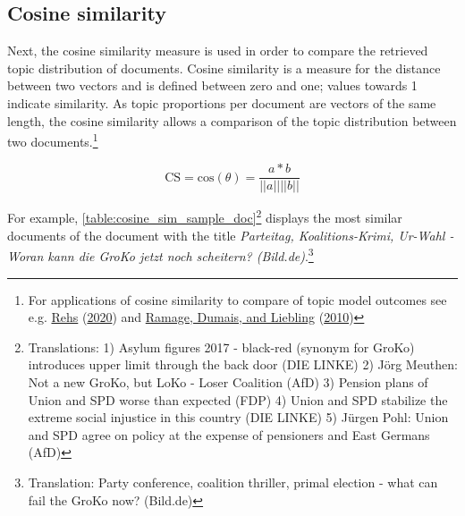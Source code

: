 \documentclass[
]{article}
\begin{document}
\hypertarget{cosine-similarity}{%
\subsection{Cosine similarity}\label{cosine-similarity}}

Next, the cosine similarity measure is used in order to compare the
retrieved topic distribution of documents. Cosine similarity is a
measure for the distance between two vectors and is defined between zero
and one; values towards 1 indicate similarity. As topic proportions per
document are vectors of the same length, the cosine similarity allows a
comparison of the topic distribution between two documents.\footnote{For
  applications of cosine similarity to compare of topic model outcomes
  see e.g. \protect\hyperlink{ref-rehs_structural_2020}{Rehs}
  (\protect\hyperlink{ref-rehs_structural_2020}{2020}) and
  \protect\hyperlink{ref-ramage_characterizing_2010}{Ramage, Dumais, and
  Liebling} (\protect\hyperlink{ref-ramage_characterizing_2010}{2010})}

\[
\text{CS} = \text{cos}(\theta)=\frac{a*b}{||a|| ||b||}
\]

For example, \autoref{table:cosine_sim_sample_doc}\footnote{Translations:
  1) Asylum figures 2017 - black-red (synonym for GroKo) introduces
  upper limit through the back door (DIE LINKE) 2) Jörg Meuthen: Not a
  new GroKo, but LoKo - Loser Coalition (AfD) 3) Pension plans of Union
  and SPD worse than expected (FDP) 4) Union and SPD stabilize the
  extreme social injustice in this country (DIE LINKE) 5) Jürgen Pohl:
  Union and SPD agree on policy at the expense of pensioners and East
  Germans (AfD)} displays the most similar documents of the document
with the title \emph{Parteitag, Koalitions-Krimi, Ur-Wahl - Woran kann
die GroKo jetzt noch scheitern? (Bild.de)}.\footnote{Translation: Party
  conference, coalition thriller, primal election - what can fail the
  GroKo now? (Bild.de)}
\end{document}
